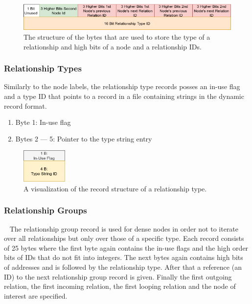\documentclass[a4paper,10pt]{article}
\begin{document}
            \begin{figure}[htp]\label{rel_type_bytes}
                \begin{center}
                    \includegraphics[keepaspectratio,width=\textwidth]{img/03_record/relationship/relationship_type_bytes.png}
                \end{center}
                \caption{The structure of the bytes that are used to store the type of a relationship and high bits of a node and a relationship IDs.}
            \end{figure}
        

        \subsubsection{Relationship Types}
            Similarly to the node labels, the relationship type records posses an in-use flag and a type ID that points to a record in a file containing strings in the dynamic record format.
            \begin{enumerate}
                \item Byte 1: In-use flag
                \item Bytes 2 --- 5: Pointer to the type string entry
            \end{enumerate}
        
            \begin{figure}[htp]\label{rel_type_record}
                \begin{center}
                    \includegraphics[keepaspectratio,height=0.2\textheight,width=0.2\textwidth]{img/03_record/relationship/rel_type_record.png}
                \end{center}
                \caption{A visualization of the record structure of a relationship type.} 
            \end{figure}
            
        \subsubsection{Relationship Groups}~\label{rel_group}
            The relationship group record is used for dense nodes in order not to iterate over all relationships but only over those of a specific type.
            Each record consists of 25 bytes where the first byte again contains the in-use flags and the high order bits of IDs that do not fit into integers.
            The next bytes again contains high bits of addresses and is followed by the relationship type.
            After that a reference (an ID) to the next relationship group record is given.
            Finally the first outgoing relation, the first incoming relation, the first looping relation and the node of interest are specified.
        
\end{document}
